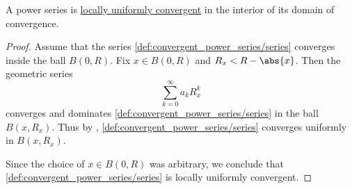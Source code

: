 \begin{proposition}\label{thm:power_series_are_locally_uniform_convergent}
  A power series is \hyperref[def:function_net_convergence/locally_uniform]{locally uniformly convergent} in the interior of its domain of convergence.
\end{proposition}
\begin{proof}
  Assume that the series \eqref{def:convergent_power_series/series} converges inside the ball \( B(0, R) \). Fix \( x \in B(0, R) \) and \( R_x < R - \abs{x} \). Then the geometric series
  \begin{equation*}
    \sum_{k=0}^\infty a_k R_x^k
  \end{equation*}
  converges and dominates \eqref{def:convergent_power_series/series} in the ball \( B(x, R_x) \). Thus by , \eqref{def:convergent_power_series/series} converges uniformly in \( B(x, R_x) \).

  Since the choice of \( x \in B(0, R) \) was arbitrary, we conclude that \eqref{def:convergent_power_series/series} is locally uniformly convergent.
\end{proof}

